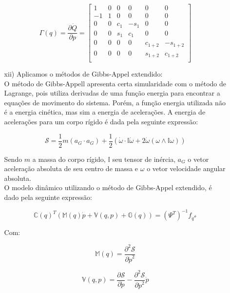 \begin{itemize}
\begin{itemize}
	\begin{equation}
	\Gamma(q) = \frac{\partial \dot{Q}}{\partial p} =
	\begin{bmatrix}
	1 & 0 & 0 & 0 & 0 & 0 \\
	-1 & 1 & 0 & 0 & 0 & 0 \\
	0 & 0 & c_1 & -s_1 & 0 & 0 \\
	0 & 0 & s_1 & c_1 & 0 & 0 \\
	0 & 0 & 0 & 0 & c_{1+2} & -s_{1+2} \\
	0 & 0 & 0 & 0 & s_{1+2} & c_{1+2} \\
	\end{bmatrix}
	\end{equation}

	\item[xii)] Aplicamos o métodos de Gibbs-Appel extendido: \\
	
	O método de Gibbs-Appell apresenta certa simularidade com o método de Lagrange, pois utiliza derivadas de uma fun\c{c}\~ao energia para encontrar a equa\c{c}\~oes de movimento do sistema. Por\'em, a fun\c{c}\~ao energia utilizada não é a energia cinética, mas sim a energia de acelera\c{c}\~oes. A energia de acelera\c{c}\~oes para um corpo r\'igido \'e dada pela seguinte express\~ao:

	$$ \mathcal{S} = \frac{1}{2} m ( a_G \cdot a_G ) + \frac{1}{2}( \dot{\omega} \cdot \mathbb{I} \dot{\omega} + 2 \dot{\omega} (\omega \wedge 	\mathbb{I} \omega )  )  $$
 
	Sendo $m$ a massa do corpo r\'igido, $\mathbb{I}$ seu tensor de in\'ercia, $a_G$ o vetor acelera\c{c}\~ao absoluta de seu centro de massa e $\omega$ o vetor velocidade angular absoluta.  \\

	O modelo dinâmico utilizando o método de Gibbs-Appel extendido, é dado pela seguinte expressão:
	
	\begin{equation}
	\mathbb{C}(q)^T ( \mathbb{M}(q) \dot{p} + \mathbb{V}(q,p) + \mathbb{G}(q)) = (\Psi^T)^{-1} f_{\dot{q}^{\#}} 
	\end{equation}
	
	Com:
	
	\begin{equation}
	\mathbb{M}(q) = \frac{\partial^2 \mathcal{S}}{\partial \dot{p}^2}
	\end{equation}
	
	\begin{equation}
	\mathbb{V}(q,p) =  \frac{\partial \mathcal{S}}{\partial \dot{p}} - \frac{\partial^2 \mathcal{S}}{\partial \dot{p}^2} \dot{p}
	\end{equation}
	

\end{itemize}
\end{itemize}
